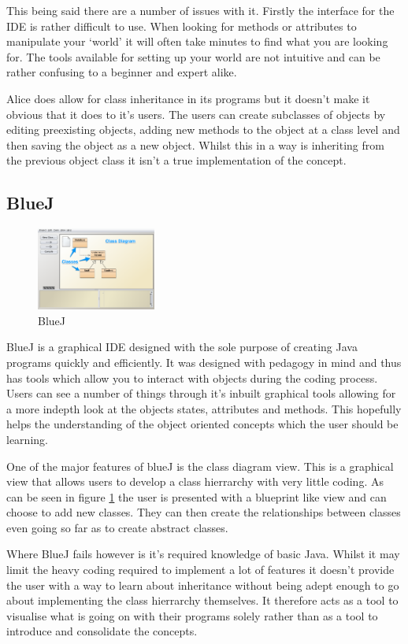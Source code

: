 \documentclass{l4proj}
\begin{document}
This being said there are a number of issues with it. Firstly the interface for the IDE is rather difficult to use. When looking for methods or attributes to manipulate your `world' it will often take minutes to find what you are looking for. The tools available for setting up your world are not intuitive and can be rather confusing to a beginner and expert alike.

Alice does allow for class inheritance in its programs but it doesn't make it obvious that it does to it's users. The users can create subclasses of objects by editing preexisting objects, adding new methods to the object at a class level and then saving the object as a new object. Whilst this in a way is inheriting from the previous object class it isn't a true implementation of the concept. 
 
\subsection{BlueJ}
\begin{figure}[h]
    \centering
    \includegraphics[width=0.35\textwidth]{images/BlueJ}
    \caption{BlueJ}
    \label{fig:BlueJ}
\end{figure}
BlueJ is a graphical IDE designed with the sole purpose of creating Java programs quickly and efficiently.
It was designed with pedagogy in mind and thus has tools which allow you to interact with objects during the coding process. Users can see a number of things through it’s inbuilt graphical tools allowing for a more indepth look at the objects states, attributes and methods. This hopefully helps the understanding of the object oriented concepts which the user should be learning.

One of the major features of blueJ is the class diagram view. This is a graphical view that allows users to develop a class hierrarchy with very little coding. As can be seen in figure \ref{fig:BlueJ} the user is presented with a blueprint like view and can choose to add new classes. They can then create the relationships between classes even going so far as to create abstract classes.

Where BlueJ fails however is it's required knowledge of basic Java. Whilst it may limit the heavy coding required to implement a lot of features it doesn't provide the user with a way to learn about inheritance without being adept enough to go about implementing the class hierrarchy themselves. It therefore acts as a tool to visualise what is going on with their programs solely rather than as a tool to introduce and consolidate the concepts. 
\end{document}
